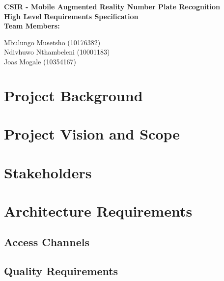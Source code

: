 \documentclass[12pt]{article}
\newcommand{\Title}{CSIR - Mobile Augmented Reality Number Plate Recognition} %
\begin{document}
        \vspace{4em}
        
        \begin{center}%
        	
		
          \LARGE \bf \Title \\[4em]
          \LARGE {\bf High Level Requirements Specification}\\[1em]
          \LARGE {\bf Team Members:}\\[2em]
          \large
          
             Mbulungo Musetsho                          (10176382) \\[1em]
             Ndivhuwo Nthambeleni (10001183)	\\[1em]
             Joas Mogale (10354167)		\\[1em]
            
        \end{center}%
        

        \newpage
        \tableofcontents    
                \newpage
                \section{Project Background}
                \section{Project Vision and Scope}
                \section{Stakeholders}
                 
                 \section{Architecture Requirements}
                    \subsection{Access Channels}
                    
               		\subsection{Quality Requirements}
\end{document}
